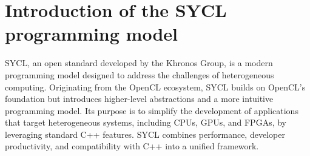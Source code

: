 
\section{Introduction of the SYCL programming model}

% 
% 
% 
% 
% 
% 

SYCL, an open standard developed by the Khronos Group, is a modern programming model designed to address the challenges of
heterogeneous computing. Originating from the OpenCL ecosystem, SYCL builds on OpenCL's foundation but introduces higher-level
abstractions and a more intuitive programming model. Its purpose is to simplify the development of applications that target
heterogeneous systems, including CPUs, GPUs, and FPGAs, by leveraging standard C++ features. SYCL combines performance,
developer productivity, and compatibility with C++ into a unified framework. 

